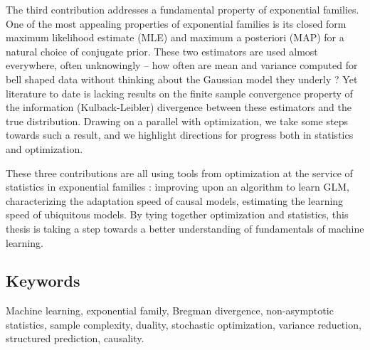 \documentclass[12pt]{report} %
\numberwithin{equation}{chapter}
\numberwithin{table}{chapter}
\numberwithin{figure}{chapter}
\begin{document}
The third contribution addresses a fundamental property of exponential families. 
One of the most appealing properties of exponential families is its closed form maximum likelihood estimate (MLE) and maximum a posteriori (MAP) for a natural choice of conjugate prior. These two estimators are used almost everywhere, often unknowingly
-- how often are mean and variance computed for bell shaped data without thinking about the Gaussian model they underly ?
Yet literature to date is lacking results on the finite sample convergence property of the information (Kulback-Leibler) divergence  between these estimators and the true distribution. 
Drawing on a parallel with optimization, we take some steps towards such a result, and we highlight directions for progress both in statistics and optimization. 

These three contributions are all using tools from optimization at the service of statistics in exponential families : improving upon an algorithm to learn GLM, characterizing the adaptation speed of causal models, estimating the learning speed of ubiquitous models.
By tying together optimization and statistics, this thesis is taking a step towards a better understanding of fundamentals of machine learning.

\subsection*{Keywords}
Machine learning, exponential family, Bregman divergence, non-asymptotic statistics, sample complexity, duality, stochastic optimization, variance reduction, structured prediction, causality.



\cleardoublepage
{}  %
\tableofcontents
\cleardoublepage
{}  %
\listoftables
\cleardoublepage
{}
\listoffigures

\end{document}
